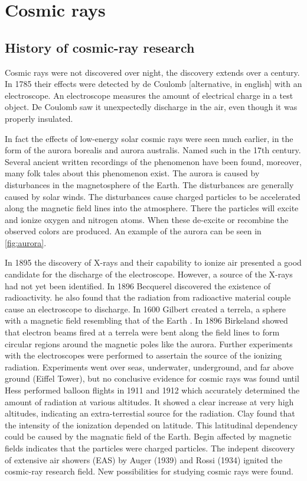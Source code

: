 \chapter{Cosmic rays}
\label{ch:cosmic-rays}


\section{History of cosmic-ray research}

Cosmic rays were not discovered over night, the discovery extends over a century. In 1785 their effects were detected by de Coulomb \cite{coulomb1785electroscope} [alternative, in english] with an electroscope. An electroscope measures the amount of electrical charge in a test object. De Coulomb saw it unexpectedly discharge in the air, even though it was properly insulated.

In fact the effects of low-energy solar cosmic rays were seen much earlier, in the form of the aurora borealis and aurora australis. Named such in the 17th century. Several ancient written recordings of the phenomenon \cite{stephenson2004aurora} have been found, moreover, many folk tales about this phenomenon exist. The aurora is caused by disturbances in the magnetosphere of the Earth. The disturbances are generally caused by solar winds. The disturbances cause charged particles to be accelerated along the magnetic field lines into the atmosphere. There the particles will excite and ionize oxygen and nitrogen atoms. When these de-excite or recombine the observed colors are produced. An example of the aurora can be seen in \cref{fig:aurora}.

In 1895 the discovery of X-rays and their capability to ionize air \cite{roentgen1895radiation,flakus1981radiation} presented a good candidate for the discharge of the electroscope. However, a source of the X-rays had not yet been identified. In 1896 Becquerel discovered the existence of radioactivity. he also found that the radiation from radioactive material couple cause an electroscope to discharge. In 1600 Gilbert created a terrela, a sphere with a magnetic field resembling that of the Earth \cite{gilbert1893terrela-en}. In 1896 Birkeland \cite{birkeland1896aurora} showed that electron beams fired at a terrela were bent along the field lines to form circular regions around the magnetic poles like the aurora. Further experiments with the electroscopes were performed to assertain the source of the ionizing radiation. Experiments went over seas, underwater, underground, and far above ground (Eiffel Tower), but no conclusive evidence for cosmic rays was found until Hess performed balloon flights in 1911 and 1912 which accurately determined the amount of radiation at various altitudes. It showed a clear increase at very high altitudes, indicating an extra-terrestial source for the radiation. Clay found that the intensity of the ionization depended on latitude. This latitudinal dependency could be caused by the magnatic field of the Earth. Begin affected by magnetic fields indicates that the particles were charged particles. The indepent discovery of extensive air showers (EAS) by Auger (1939) \cite{auger1939eas} and Rossi (1934) ignited the cosmic-ray research field. New possibilities for studying cosmic rays were found.

